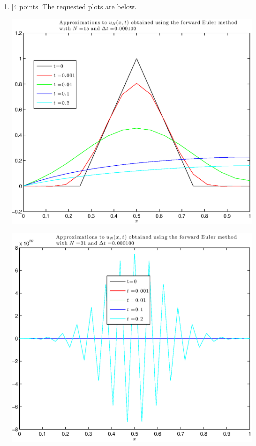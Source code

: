 \begin{solution}
\begin{enumerate}


\vspace*{1em}
\item {[4 points]} The requested plots are below.
\begin{center}
\includegraphics[scale=0.75]{hw50d15.eps}
\end{center}
\begin{center}
\includegraphics[scale=0.75]{hw50d31.eps}
\end{center}


\end{enumerate}
\end{solution}
